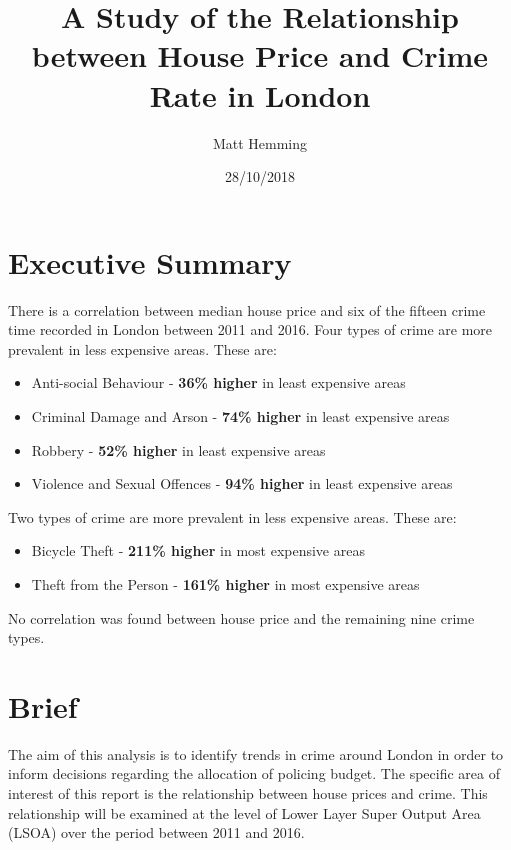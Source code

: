 \documentclass{article}
\title{A Study of the Relationship between House Price and Crime Rate in London}
\date{28/10/2018}
\author{Matt Hemming}
\begin{document}

\maketitle %
\newpage %

\tableofcontents
\newpage

\section{Executive Summary} \label{Executive Summary}

There is a correlation between median house price and six of the fifteen crime time recorded in London between 2011 and 2016. Four types of crime are more prevalent in less expensive areas. These are:
\begin{itemize}
\item Anti-social Behaviour - \textbf{36\% higher} in least expensive areas
\item Criminal Damage and Arson	    - \textbf{74\% higher} in least expensive areas
\item Robbery			    - \textbf{52\% higher} in least expensive areas
\item Violence and Sexual Offences - \textbf{94\% higher} in least expensive areas
\end{itemize}
Two types of crime are more prevalent in less expensive areas. These are:
\begin{itemize}
\item Bicycle Theft 			   - \textbf{211\% higher} in most expensive areas
\item Theft from the Person 	   - \textbf{161\% higher} in most expensive areas
\end{itemize}

No correlation was found between house price and the remaining nine crime types.
\section{Brief}

The aim of this analysis is to identify trends in crime around London in order to inform decisions regarding the allocation of policing budget. The specific area of interest of this report is the relationship between house prices and crime. This relationship will be examined at the level of Lower Layer Super Output Area (LSOA) over the period between 2011 and 2016. 
\end{document}
